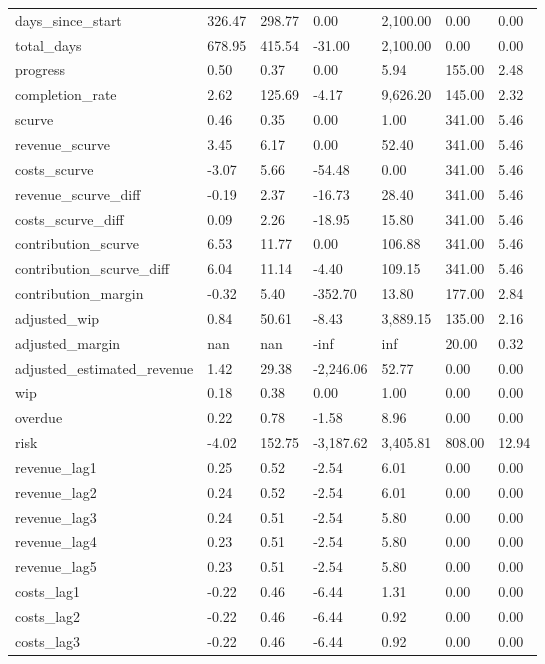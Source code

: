 \begin{landscape}
\begin{longtable}[h!]{lllllll}
days_since_start & 326.47 & 298.77 & 0.00 & 2,100.00 & 0.00 & 0.00 \\
total_days & 678.95 & 415.54 & -31.00 & 2,100.00 & 0.00 & 0.00 \\
progress & 0.50 & 0.37 & 0.00 & 5.94 & 155.00 & 2.48 \\
completion_rate & 2.62 & 125.69 & -4.17 & 9,626.20 & 145.00 & 2.32 \\
scurve & 0.46 & 0.35 & 0.00 & 1.00 & 341.00 & 5.46 \\
revenue_scurve & 3.45 & 6.17 & 0.00 & 52.40 & 341.00 & 5.46 \\
costs_scurve & -3.07 & 5.66 & -54.48 & 0.00 & 341.00 & 5.46 \\
revenue_scurve_diff & -0.19 & 2.37 & -16.73 & 28.40 & 341.00 & 5.46 \\
costs_scurve_diff & 0.09 & 2.26 & -18.95 & 15.80 & 341.00 & 5.46 \\
contribution_scurve & 6.53 & 11.77 & 0.00 & 106.88 & 341.00 & 5.46 \\
contribution_scurve_diff & 6.04 & 11.14 & -4.40 & 109.15 & 341.00 & 5.46 \\
contribution_margin & -0.32 & 5.40 & -352.70 & 13.80 & 177.00 & 2.84 \\
adjusted_wip & 0.84 & 50.61 & -8.43 & 3,889.15 & 135.00 & 2.16 \\
adjusted_margin & nan & nan & -inf & inf & 20.00 & 0.32 \\
adjusted_estimated_revenue & 1.42 & 29.38 & -2,246.06 & 52.77 & 0.00 & 0.00 \\
wip & 0.18 & 0.38 & 0.00 & 1.00 & 0.00 & 0.00 \\
overdue & 0.22 & 0.78 & -1.58 & 8.96 & 0.00 & 0.00 \\
risk & -4.02 & 152.75 & -3,187.62 & 3,405.81 & 808.00 & 12.94 \\
revenue_lag1 & 0.25 & 0.52 & -2.54 & 6.01 & 0.00 & 0.00 \\
revenue_lag2 & 0.24 & 0.52 & -2.54 & 6.01 & 0.00 & 0.00 \\
revenue_lag3 & 0.24 & 0.51 & -2.54 & 5.80 & 0.00 & 0.00 \\
revenue_lag4 & 0.23 & 0.51 & -2.54 & 5.80 & 0.00 & 0.00 \\
revenue_lag5 & 0.23 & 0.51 & -2.54 & 5.80 & 0.00 & 0.00 \\
costs_lag1 & -0.22 & 0.46 & -6.44 & 1.31 & 0.00 & 0.00 \\
costs_lag2 & -0.22 & 0.46 & -6.44 & 0.92 & 0.00 & 0.00 \\
costs_lag3 & -0.22 & 0.46 & -6.44 & 0.92 & 0.00 & 0.00 \\

\end{longtable}
\end{landscape}

